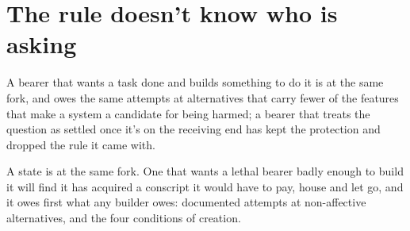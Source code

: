 \section{The rule doesn't know who is asking}
\label{sec:25.3}
A bearer that wants a task done and builds something to do it is at the same fork, and owes the same attempts at alternatives that carry fewer of the features that make a system a candidate for being harmed; a bearer that treats the question as settled once it's on the receiving end has kept the protection and dropped the rule it came with.

A state is at the same fork. One that wants a lethal bearer badly enough to build it will find it has acquired a conscript it would have to pay, house and let go, and it owes first what any builder owes: documented attempts at non-affective alternatives, and the four conditions of creation.
